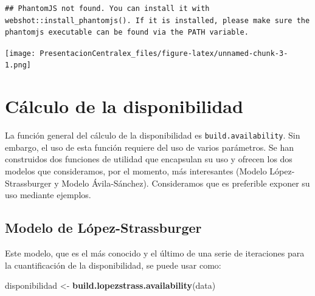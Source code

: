 \documentclass[
]{article}
\newenvironment{Shaded}{\begin{snugshade}}{\end{snugshade}}
\newcommand{\KeywordTok}[1]{\textcolor[rgb]{0.13,0.29,0.53}{\textbf{#1}}}
\newcommand{\NormalTok}[1]{#1}
\newcommand{\OperatorTok}[1]{\textcolor[rgb]{0.81,0.36,0.00}{\textbf{#1}}}
\newcommand{\StringTok}[1]{\textcolor[rgb]{0.31,0.60,0.02}{#1}}
\begin{document}
\begin{Shaded}
\end{Shaded}

\begin{verbatim}
## PhantomJS not found. You can install it with webshot::install_phantomjs(). If it is installed, please make sure the phantomjs executable can be found via the PATH variable.
\end{verbatim}

\texttt{[image: PresentacionCentralex\_files/figure-latex/unnamed-chunk-3-1.png]}

\hypertarget{cuxe1lculo-de-la-disponibilidad}{%
\section{Cálculo de la
disponibilidad}\label{cuxe1lculo-de-la-disponibilidad}}

La función general del cálculo de la disponibilidad es
\texttt{build.availability}. Sin embargo, el uso de esta función
requiere del uso de varios parámetros. Se han construidos dos funciones
de utilidad que encapsulan su uso y ofrecen los dos modelos que
consideramos, por el momento, más interesantes (Modelo
López-Strassburger y Modelo Ávila-Sánchez). Consideramos que es
preferible exponer su uso mediante ejemplos.

\hypertarget{modelo-de-luxf3pez-strassburger}{%
\subsection{Modelo de
López-Strassburger}\label{modelo-de-luxf3pez-strassburger}}

Este modelo, que es el más conocido y el último de una serie de
iteraciones para la cuantificación de la disponibilidad, se puede usar
como:

\begin{Shaded}
\begin{Highlighting}[]
\NormalTok{disponibilidad <-}\StringTok{ }\KeywordTok{build.lopezstrass.availability}\NormalTok{(data)}
\end{Highlighting}
\end{Shaded}
\end{document}
